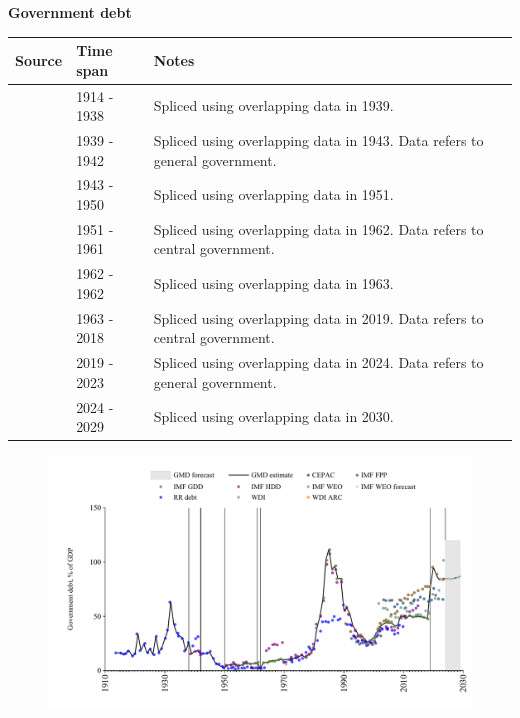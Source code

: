 \documentclass[12pt,a4paper,landscape]{article}
\begin{document}
\begin{adjustbox}{max totalsize={\paperwidth}{\paperheight},center}
\begin{minipage}[t][\textheight][t]{\textwidth}
\vspace*{0.5cm}
{}
\begin{center}
{\Large\bfseries Government debt}
\end{center}
\vspace{0.5cm}
\begin{table}[H]
\centering
\small
\begin{tabular}{|l|l|l|}
\hline
\textbf{Source} & \textbf{Time span} & \textbf{Notes} \\
\hline
\rowcolor{white}\cite{RR_debt}& 1914 - 1938 &Spliced using overlapping data in 1939. \\
\rowcolor{lightgray}\cite{IMF_HDD}& 1939 - 1942 &Spliced using overlapping data in 1943. Data refers to general government.\\
\rowcolor{white}\cite{RR_debt}& 1943 - 1950 &Spliced using overlapping data in 1951. \\
\rowcolor{lightgray}\cite{IMF_GDD}& 1951 - 1961 &Spliced using overlapping data in 1962. Data refers to central government.\\
\rowcolor{white}\cite{RR_debt}& 1962 - 1962 &Spliced using overlapping data in 1963. \\
\rowcolor{lightgray}\cite{IMF_GDD}& 1963 - 2018 &Spliced using overlapping data in 2019. Data refers to central government.\\
\rowcolor{white}\cite{IMF_FPP}& 2019 - 2023 &Spliced using overlapping data in 2024. Data refers to general government.\\
\rowcolor{lightgray}\cite{IMF_WEO_forecast}& 2024 - 2029 &Spliced using overlapping data in 2030. \\
\hline
\end{tabular}
\end{table}
\begin{figure}[H]
\centering
\includegraphics[width=\textwidth,height=0.6\textheight,keepaspectratio]{graphs/SLV_govdebt_GDP.pdf}
\end{figure}
\end{minipage}
\end{adjustbox}
\end{document}
